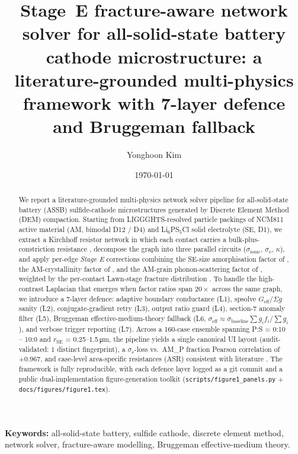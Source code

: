 \documentclass[11pt, a4paper]{article}
\title{Stage~E fracture-aware network solver for all-solid-state battery
       cathode microstructure: a literature-grounded multi-physics
       framework with 7-layer defence and Bruggeman fallback}
\author[1]{Yonghoon Kim}
\affil[1]{Department of Materials Science and Engineering,
          Korea Advanced Institute of Science and Technology (KAIST)}
\date{\today}
\newcommand{\sigmaionic}{\ensuremath{\sigma_{\mathrm{ionic}}}}
\newcommand{\sigmae}{\ensuremath{\sigma_{\mathrm{e}}}}
\begin{document}
\maketitle

\begin{abstract}
We report a literature-grounded multi-physics network solver pipeline
for all-solid-state battery (ASSB) sulfide-cathode microstructures
generated by Discrete Element Method (DEM) compaction. Starting from
LIGGGHTS-resolved particle packings of NCM811 active material (AM,
bimodal D12 / D4) and Li$_6$PS$_5$Cl solid electrolyte (SE, D1), we
extract a Kirchhoff resistor network in which each contact carries a
bulk-plus-constriction resistance \citep{Holm1967}, decompose the
graph into three parallel circuits ($\sigmaionic$, $\sigmae$, $\kappa$),
and apply per-edge \emph{Stage E} corrections combining the SE-size
amorphisation factor of \citet{Cronau2021}, the AM-crystallinity factor
of \citet{Trevisanello2021}, and the AM-grain phonon-scattering factor
of \citet{Wang2022}, weighted by the per-contact Lawn-stage fracture
distribution \citep{Lawn1998}. To handle the high-contrast Laplacian
that emerges when factor ratios span $20\times$ across the same graph,
we introduce a 7-layer defence: adaptive boundary conductance (L1),
spsolve $G_{\mathrm{eff}} / \Sigma g$ sanity (L2), conjugate-gradient
retry (L3), output ratio guard (L4), section-7 anomaly filter (L5),
Bruggeman effective-medium-theory fallback (L6, $\sigma_{\mathrm{eff}}
\approx \sigma_{\mathrm{baseline}}\sum g_i f_i / \sum g_i$), and
verbose trigger reporting (L7). Across a 160-case ensemble spanning
P:S = 0:10 -- 10:0 and $r_{\mathrm{SE}}$ = 0.25--1.5\,\si{\micro\meter},
the pipeline yields a single canonical UI layout (audit-validated:
1 distinct fingerprint), a $\sigmae$-loss vs.\ AM\_P fraction Pearson
correlation of $+0.967$, and case-level area-specific resistances
(ASR) consistent with literature
\citep{Bielefeld2022, Minnmann2021, Lee2020}. The framework is
fully reproducible, with each defence layer logged as a git commit
and a public dual-implementation figure-generation toolkit
(\texttt{scripts/figure1\_panels.py} + \texttt{docs/figures/figure1.tex}).
\end{abstract}

\noindent
\textbf{Keywords:} all-solid-state battery, sulfide cathode,
discrete element method, network solver, fracture-aware modelling,
Bruggeman effective-medium theory.
\end{document}
